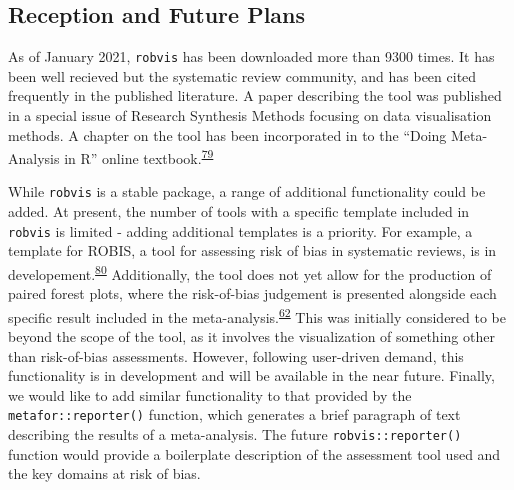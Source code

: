 \documentclass[a4paper, twoside]{templates/ociamthesis}
\newcommand*{\bibtitle}{Bibliography}
\begin{document}
\hypertarget{reception-and-future-plans-1}{%
\subsection{Reception and Future Plans}\label{reception-and-future-plans-1}}

As of January 2021, \texttt{robvis} has been downloaded more than 9300 times. It has been well recieved but the systematic review community, and has been cited frequently in the published literature. A paper describing the tool was published in a special issue of Research Synthesis Methods focusing on data visualisation methods. A chapter on the tool has been incorporated in to the ``Doing Meta-Analysis in R'' online textbook.\textsuperscript{\protect\hyperlink{ref-mathias_harrer_2019_2551803}{79}}

While \texttt{robvis} is a stable package, a range of additional functionality could be added. At present, the number of tools with a specific template included in \texttt{robvis} is limited - adding additional templates is a priority. For example, a template for ROBIS, a tool for assessing risk of bias in systematic reviews, is in developement.\textsuperscript{\protect\hyperlink{ref-whiting2016robis}{80}} Additionally, the tool does not yet allow for the production of paired forest plots, where the risk-of-bias judgement is presented alongside each specific result included in the meta-analysis.\textsuperscript{\protect\hyperlink{ref-cochranechpt7}{62}} This was initially considered to be beyond the scope of the tool, as it involves the visualization of something other than risk-of-bias assessments. However, following user-driven demand, this functionality is in development and will be available in the near future. Finally, we would like to add similar functionality to that provided by the \texttt{metafor::reporter()} function, which generates a brief paragraph of text describing the results of a meta-analysis. The future \texttt{robvis::reporter()} function would provide a boilerplate description of the assessment tool used and the key domains at risk of bias.




\setlength{\baselineskip}{0pt} %

{\renewcommand*\MakeUppercase[1]{#1}%
\printbibliography[heading=bibintoc,title={\bibtitle}]}
\end{document}
